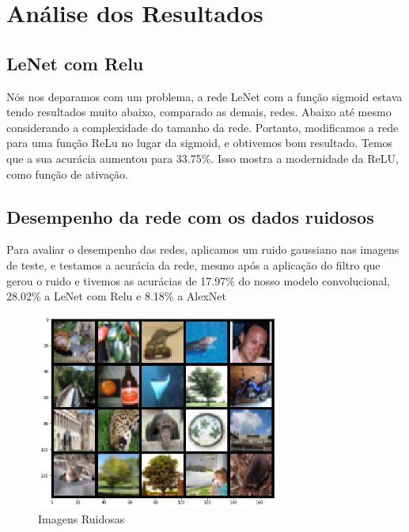 \documentclass[conference]{IEEEtran}
\begin{document}
\section{Análise dos Resultados}
\subsection{LeNet com Relu}
Nós nos deparamos com um problema, a rede LeNet com a função sigmoid estava tendo resultados muito abaixo, comparado as demais, redes. Abaixo até mesmo considerando a complexidade do tamanho da rede. Portanto, modificamos a rede para uma função ReLu no lugar da sigmoid, e obtivemos bom resultado. Temos que a sua acurácia aumentou para 33.75\%. Isso mostra a modernidade da ReLU, como função de ativação.
\subsection{Desempenho da rede com os dados ruidosos}
Para avaliar o desempenho das redes, aplicamos um ruido gaussiano nas imagens de teste, e testamos a acurácia da rede, mesmo após a aplicação do filtro que gerou o ruido e tivemos as acurácias de 17.97\% do nosso modelo convolucional, 28.02\% a LeNet com Relu e 8.18\% a AlexNet

\begin{figure}[h]
	\centerline{\includegraphics[width=8cm]{Images/imagensnoised.png}}
	
	\caption{\label{fig:fig2}Imagens Ruidosas}
\end{figure}
\end{document}
